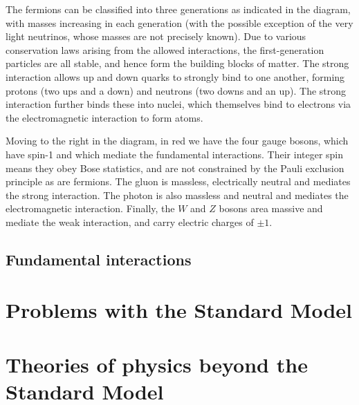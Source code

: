 The fermions can be classified into three generations as indicated in the diagram, with masses
increasing in each generation (with the possible exception of the very light neutrinos, whose
masses are not precisely known). Due to various conservation laws arising from the allowed 
interactions, the first-generation particles are all stable, and hence form the building
blocks of matter. The strong interaction allows up and down quarks to strongly bind to
one another, forming protons (two ups and a down) and neutrons (two downs and an up).
The strong interaction further binds these into nuclei, which themselves bind to electrons via the electromagnetic
interaction to form atoms.

Moving to the right in the diagram, in red we have the four gauge bosons, which have spin-1
and which mediate the fundamental interactions. Their integer spin means they obey Bose statistics,
and are not constrained by the Pauli exclusion principle as are fermions. 
The gluon is massless, electrically neutral and mediates the strong
interaction. The photon is also massless and neutral and mediates the electromagnetic interaction. Finally,
the $W$ and $Z$ bosons area massive and mediate the weak interaction, and carry electric charges of $\pm1$.

\subsection{Fundamental interactions}

\section{Problems with the Standard Model}

\section{Theories of physics beyond the Standard Model}
\label{sec:bsm}
